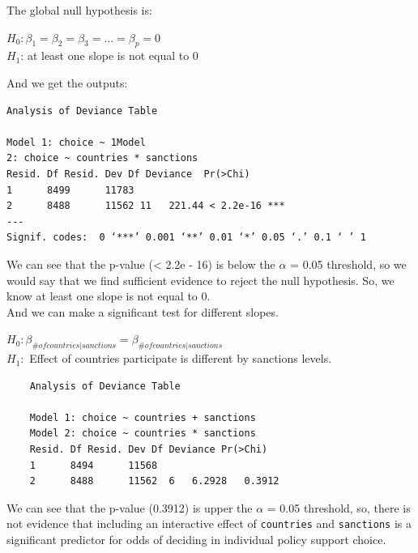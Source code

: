 \documentclass{article} %
\begin{document}
\noindent The global null hypothesis is: \\
\begin{center}
	$H_0: \beta_1 = \beta_2 = \beta_3 = ... = \beta_p = 0$ \\
	$H_1$: at least one slope is not equal to 0 \\
\end{center}

 

\noindent And we get the outputs:\\

\begin{verbatim}
Analysis of Deviance Table

Model 1: choice ~ 1Model 
2: choice ~ countries * sanctions  
Resid. Df Resid. Dev Df Deviance  Pr(>Chi)    
1      8499      11783                          
2      8488      11562 11   221.44 < 2.2e-16 ***
---
Signif. codes:  0 ‘***’ 0.001 ‘**’ 0.01 ‘*’ 0.05 ‘.’ 0.1 ‘ ’ 1
\end{verbatim}

\noindent We can see that the p-value (< 2.2e - 16) is below the $\alpha$ = 0.05 threshold, so we would say that we find sufficient evidence to reject the null hypothesis. So, we know at least one slope is not equal to 0.\\

\noindent And we can make a significant test for different slopes.

\begin{center}
	$H_0:  \beta_{\# of countries | sanctions} = \beta_{\# of countries | sanctions}$ \\
	$H_1: $ Effect of countries participate is different by sanctions levels. \\
\end{center}
 

\begin{verbatim}
	Analysis of Deviance Table
	
	Model 1: choice ~ countries + sanctions
	Model 2: choice ~ countries * sanctions  
	Resid. Df Resid. Dev Df Deviance Pr(>Chi)
	1      8494      11568                     
	2      8488      11562  6   6.2928   0.3912
\end{verbatim}

\noindent We can see that the p-value (0.3912) is upper the $\alpha$ = 0.05 threshold, so, there is not evidence that including an interactive effect of \texttt{countries} and \texttt{sanctions} is a significant predictor for odds of deciding in individual policy support choice.\\
\end{document}
